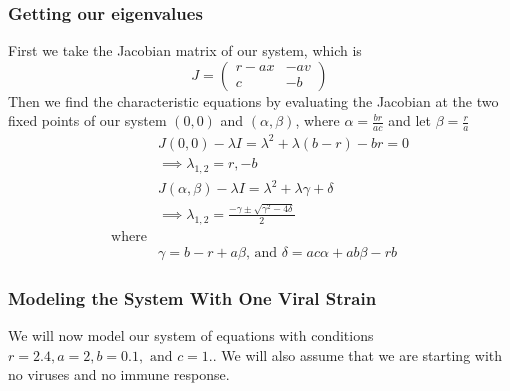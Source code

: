 \documentclass{article}
\begin{document}
\subsubsection{Getting our eigenvalues}
First we take the Jacobian matrix of our system, which is
\begin{equation}
    J =
    \begin{pmatrix}
        r-ax    & -av \\
        c       & -b
    \end{pmatrix}
\end{equation}
Then we find the characteristic equations by evaluating the Jacobian at the two fixed points of our system $(0,0)$ and $(\alpha,\beta)$, where $\alpha = \frac{br}{ac} $ and let $\beta = \frac{r}{a} $
\begin{equation}
    \begin{split}
        &J(0,0) - \lambda I = \lambda^2 + \lambda(b-r) -br = 0\\
        &\implies \lambda_{1,2} = r,-b\\
        &J(\alpha,\beta)  - \lambda I =  \lambda^2 + \lambda \gamma + \delta\\ 
        &\implies \lambda_{1,2} = \frac{-\gamma \pm \sqrt{\gamma^2 - 4\delta}}{2} \\
        \text{where} \\
        &\gamma =  b - r + a\beta \text{, and } \delta = ac\alpha + ab\beta -rb
    \end{split}
\end{equation}
\subsubsection{Modeling the System With One Viral Strain}
We will now model our system of equations with conditions $r = 2.4, a = 2, b = 0.1, \text{ and }c = 1.$. We will also assume that we are starting with no viruses and no immune response.
\label{sub:modeling the sytem}
\end{document}
